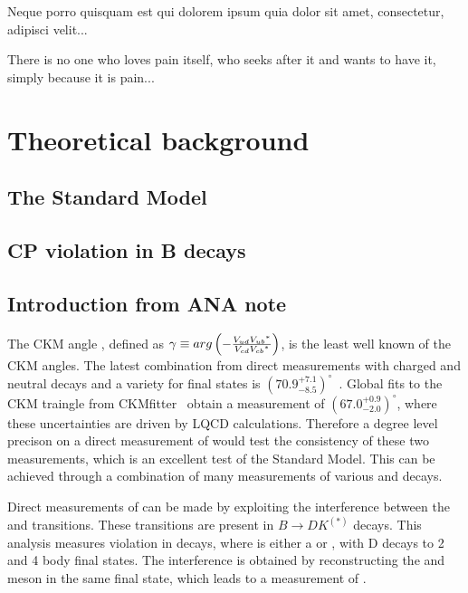 \begin{savequote}[8cm]
\textlatin{Neque porro quisquam est qui dolorem ipsum quia dolor sit amet, consectetur, adipisci velit...}

There is no one who loves pain itself, who seeks after it and wants to have it, simply because it is pain...
\end{savequote}

\chapter{\label{ch:2-background}Theoretical background} 

\minitoc

\section{The Standard Model}

\section{CP violation in B decays}

\section{Introduction from ANA note}
\label{sec:Introduction}

The CKM angle \Pgamma, defined as $\gamma \equiv arg\left(-\frac{{V_{{u}{d}}}{{V_{{u}{b}}}}^*}{{V_{{c}{d}}}{{V_{{c}{b}}}}^*}\right)$, is the least well known of the CKM angles. The latest \lhcb combination from direct measurements with charged and neutral \B decays and a variety for \D final states is $\left(70.9^{+7.1}_{-8.5}\right)^{\circ}$~\cite{LHCB-PAPER-2016-032-001}. Global fits to the CKM traingle from CKMfitter~\cite{CKMfitter2015} obtain a \Pgamma measurement of $(67.0^{+0.9}_{-2.0})^{\circ}$, where these uncertainties are driven by LQCD calculations. Therefore a degree level precison on a direct measurement of \Pgamma would test the consistency of these two measurements, which is an excellent test of the Standard Model. This can be achieved through a combination of many measurements of various \B and \D decays.

Direct measurements of \Pgamma can be made by exploiting the interference between the \decay{\bquark}{\cquark\uquarkbar\squark} and \decay{\bquark}{\uquark\cquarkbar\squark} transitions. These transitions are present in $B \to DK^{(*)}$ decays. This analysis measures \CP violation in \decay{\Bpm}{\D\Kstarpm} decays, where \D is either a \Dz or \Dzb, with D decays to 2 and 4 body final states. The interference is obtained by reconstructing the \Dz and \Dzb meson in the same final state, which leads to a measurement of \Pgamma.

